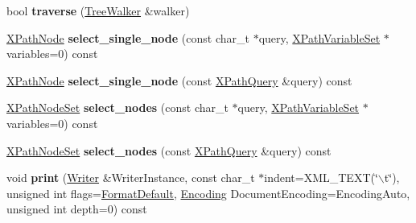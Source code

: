 \begin{DoxyCompactItemize}
\item 
\hypertarget{classphys_1_1xml_1_1Node_abf6c5b96ced5404a204a4700f044f982}{
bool {\bfseries traverse} (\hyperlink{classphys_1_1xml_1_1TreeWalker}{TreeWalker} \&walker)}
\label{d7/d0a/classphys_1_1xml_1_1Node_abf6c5b96ced5404a204a4700f044f982}

\item 
\hypertarget{classphys_1_1xml_1_1Node_ad3caa2f4cafd56c79000a5af848f3e62}{
\hyperlink{classphys_1_1xml_1_1XPathNode}{XPathNode} {\bfseries select\_\-single\_\-node} (const char\_\-t $\ast$query, \hyperlink{classphys_1_1xml_1_1XPathVariableSet}{XPathVariableSet} $\ast$variables=0) const }
\label{d7/d0a/classphys_1_1xml_1_1Node_ad3caa2f4cafd56c79000a5af848f3e62}

\item 
\hypertarget{classphys_1_1xml_1_1Node_a599ed26773b23999c6f2e87e76deb0fd}{
\hyperlink{classphys_1_1xml_1_1XPathNode}{XPathNode} {\bfseries select\_\-single\_\-node} (const \hyperlink{classphys_1_1xml_1_1XPathQuery}{XPathQuery} \&query) const }
\label{d7/d0a/classphys_1_1xml_1_1Node_a599ed26773b23999c6f2e87e76deb0fd}

\item 
\hypertarget{classphys_1_1xml_1_1Node_ad8bc358815511c63677a60149fe9a6dd}{
\hyperlink{classphys_1_1xml_1_1XPathNodeSet}{XPathNodeSet} {\bfseries select\_\-nodes} (const char\_\-t $\ast$query, \hyperlink{classphys_1_1xml_1_1XPathVariableSet}{XPathVariableSet} $\ast$variables=0) const }
\label{d7/d0a/classphys_1_1xml_1_1Node_ad8bc358815511c63677a60149fe9a6dd}

\item 
\hypertarget{classphys_1_1xml_1_1Node_ae1e232d5d010ca9272edd7bbe3154b44}{
\hyperlink{classphys_1_1xml_1_1XPathNodeSet}{XPathNodeSet} {\bfseries select\_\-nodes} (const \hyperlink{classphys_1_1xml_1_1XPathQuery}{XPathQuery} \&query) const }
\label{d7/d0a/classphys_1_1xml_1_1Node_ae1e232d5d010ca9272edd7bbe3154b44}

\item 
\hypertarget{classphys_1_1xml_1_1Node_a526817671e39653b0dca70c2ba8daa55}{
void {\bfseries print} (\hyperlink{classphys_1_1xml_1_1Writer}{Writer} \&WriterInstance, const char\_\-t $\ast$indent=XML\_\-TEXT(\char`\"{}$\backslash$t\char`\"{}), unsigned int flags=\hyperlink{namespacephys_1_1xml_a08bf6aab51f79929d9097706a5e64408}{FormatDefault}, \hyperlink{namespacephys_1_1xml_a420f5de782438f88160321385bea2015}{Encoding} DocumentEncoding=EncodingAuto, unsigned int depth=0) const }
\label{d7/d0a/classphys_1_1xml_1_1Node_a526817671e39653b0dca70c2ba8daa55}


\end{DoxyCompactItemize}
